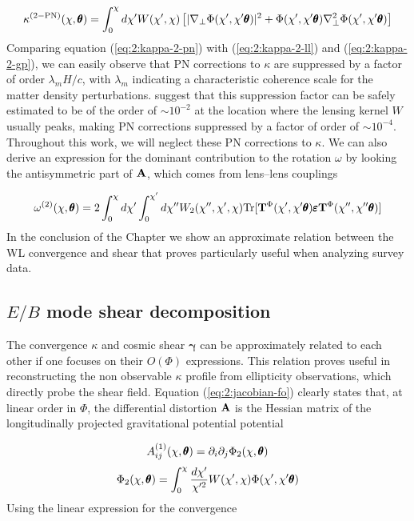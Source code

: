 \begin{equation}
\label{eq:2:kappa-2-pn}
\kappa^{(2-{\rm PN})}(\chi,\pmb{\theta}) = \int_0^\chi d\chi' W(\chi',\chi)\left[\vert\nabla_\perp\Phi(\chi',\chi'\pmb{\theta})\vert^2+\Phi(\chi',\chi'\pmb{\theta})\nabla_\perp^2\Phi(\chi',\chi'\pmb{\theta})\right]
\end{equation}
%
Comparing equation (\ref{eq:2:kappa-2-pn}) with (\ref{eq:2:kappa-2-ll}) and (\ref{eq:2:kappa-2-gp}), we can easily observe that PN corrections to $\kappa$ are suppressed by a factor of order $\lambda_m H/c$, with $\lambda_m$ indicating a characteristic coherence scale for the matter density perturbations. \citep{PNLensing} suggest that this suppression factor can be safely estimated to be of the order of $\sim 10^{-2}$ at the location where the lensing kernel $W$ usually peaks, making PN corrections suppressed by a factor of order of $\sim 10^{-4}$. Throughout this work, we will neglect these PN corrections to $\kappa$. We can also derive an expression for the dominant contribution to the rotation $\omega$ by looking the antisymmetric part of $\mathbf{A}$, which comes from lens--lens couplings

\begin{equation}
\label{eq:2:omega-2-ll}
\omega^{(2)}(\chi,\pmb{\theta}) = 2\int_0^\chi d\chi'\int_0^{\chi'}d\chi'' W_2(\chi'',\chi',\chi){\rm Tr}[\mathbf{T}^{\Phi}(\chi',\chi'\pmb{\theta})\pmb{\varepsilon}\mathbf{T}^{\Phi}(\chi'',\chi''\pmb{\theta})]
\end{equation} 
%
In the conclusion of the Chapter we show an approximate relation between the WL convergence and shear that proves particularly useful when analyzing survey data.

\subsection{$E/B$ mode shear decomposition}
The convergence $\kappa$ and cosmic shear $\pmb{\gamma}$ can be approximately related to each other if one focuses on their $O(\Phi)$ expressions. This relation proves useful in reconstructing the non observable $\kappa$ profile from ellipticity observations, which directly probe the shear field. Equation (\ref{eq:2:jacobian-fo}) clearly states that, at linear order in $\Phi$, the differential distortion $\mathbf{A}$ is the Hessian matrix of the longitudinally projected gravitational potential potential 

\begin{equation}
\label{eq:2:projection-fo-1}
A^{(1)}_{ij}(\chi,\pmb{\theta}) = \partial_i\partial_j \Phi_2(\chi,\pmb{\theta}) \\ \\
\end{equation}
%
\begin{equation}
\label{eq:2:projection-fo-2}
\Phi_2(\chi,\pmb{\theta}) = \int_0^\chi \frac{d\chi'}{\chi'^2} W(\chi',\chi)\Phi(\chi',\chi'\pmb{\theta})
\end{equation}
%
Using the linear expression for the convergence

